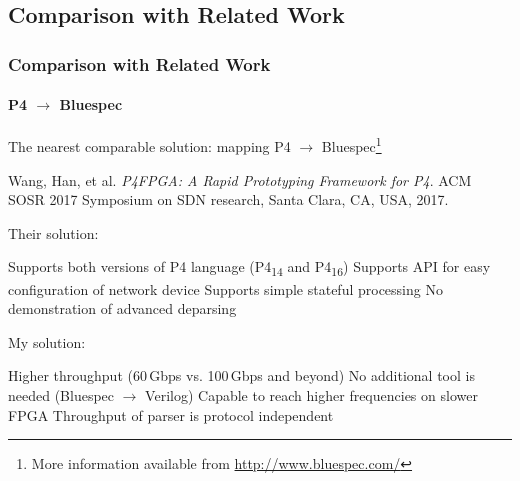 \subsection*{Comparison with Related Work}
\begin{frame}
    \frametitle{Comparison with Related Work}
    \framesubtitle{P4 $\rightarrow$ Bluespec}
    \begin{itemize}
        \fitem The nearest comparable solution: mapping P4 $\rightarrow$ Bluespec\footnote{More information available from \url{http://www.bluespec.com/}}
        \begin{itemize}
            \footnotesize
            \fitem[$\rightarrow$] Wang, Han, et al. \textit{P4FPGA: A Rapid Prototyping Framework for P4}. ACM SOSR 2017 Symposium on SDN research, Santa Clara, CA, USA, 2017.
        \end{itemize}
        \fitem Their solution:
        \begin{itemize}
            \fitem Supports both versions of P4 language (P4\textsubscript{14} and P4\textsubscript{16})
            \fitem Supports API for easy configuration of network device
            \fitem Supports simple stateful processing
            \fitem No demonstration of advanced deparsing
        \end{itemize}
        \fitem My solution:
        \begin{itemize}
            \fitem Higher throughput (60\,Gbps vs. 100\,Gbps and beyond)
            \fitem No additional tool is needed (Bluespec $\rightarrow$ Verilog)
            \fitem Capable to reach higher frequencies on slower FPGA
            \fitem Throughput of parser is protocol independent
        \end{itemize}
            
    \end{itemize}
\end{frame}
